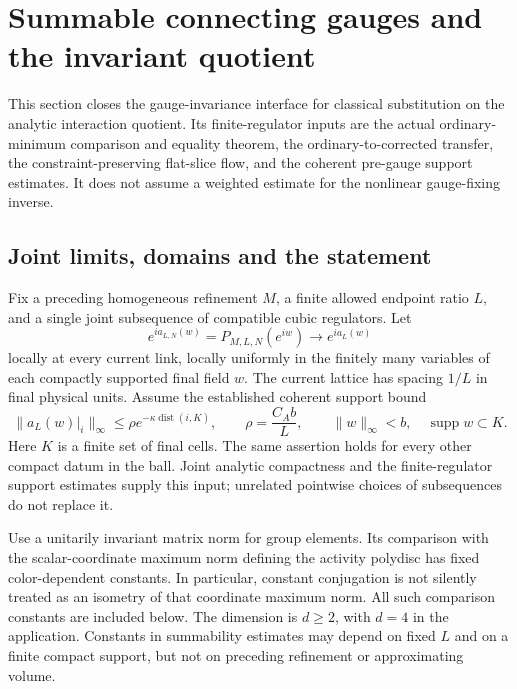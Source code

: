\documentclass[11pt]{article}
\theoremstyle{remark}
\begin{document}
\section{Summable connecting gauges and the invariant quotient}
\label{csgq-section}

This section closes the gauge-invariance interface for classical
substitution on the analytic interaction quotient. Its finite-regulator
inputs are the actual ordinary-minimum comparison and equality theorem,
the ordinary-to-corrected transfer, the constraint-preserving flat-slice
flow, and the coherent pre-gauge support estimates. It does not assume a
weighted estimate for the nonlinear gauge-fixing inverse.

\subsection{Joint limits, domains and the statement}
\label{csgq-input-section}

Fix a preceding homogeneous refinement $M$, a finite allowed endpoint
ratio $L$, and a single joint subsequence of compatible cubic regulators.
Let
\begin{equation}
 e^{ia_{L,N}(w)}=P_{M,L,N}(e^{iw})
       \longrightarrow e^{ia_L(w)}
 \label{csgq-background-limit}
\end{equation}
locally at every current link, locally uniformly in the finitely many
variables of each compactly supported final field $w$. The current
lattice has spacing $1/L$ in final physical units. Assume the established
coherent support bound
\begin{equation}
 \|a_L(w)|_i\|_\infty
 \le \rho e^{-\kappa\operatorname{dist}(i,K)},\qquad
 \rho=\frac{C_A b}{L},
 \qquad \|w\|_\infty<b,\quad \operatorname{supp}w\subset K.
 \label{csgq-background-decay}
\end{equation}
Here $K$ is a finite set of final cells. The same assertion holds for
every other compact datum in the ball. Joint analytic compactness and
the finite-regulator support estimates supply this input; unrelated
pointwise choices of subsequences do not replace it.

Use a unitarily invariant matrix norm for group elements. Its comparison
with the scalar-coordinate maximum norm defining the activity polydisc
has fixed color-dependent constants. In particular, constant conjugation
is not silently treated as an isometry of that coordinate maximum norm.
All such comparison constants are included below. The dimension is
$d\ge2$, with $d=4$ in the application. Constants in summability estimates
may depend on fixed $L$ and on a finite compact support, but not on
preceding refinement or approximating volume.
\end{document}
